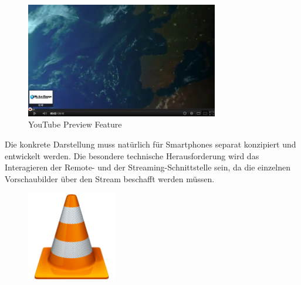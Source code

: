 \documentclass[a4paper,12pt]{article}
\begin{document}
\begin{figure}[H]
\centering
\includegraphics[width=0.75\textwidth]{youtube.png}
\caption{YouTube Preview Feature}
\label{fig:youtube}
\end{figure}

Die konkrete Darstellung muss natürlich für Smartphones separat konzipiert und entwickelt werden. Die besondere technische Herausforderung wird das Interagieren der Remote- und der Streaming-Schnittstelle sein, da die einzelnen Vorschaubilder über den Stream beschafft werden müssen.

\begin{figure}[H]
\centering
\includegraphics[width=0.35\textwidth]{vlc.png}
\end{figure}
\newpage
\end{document}
